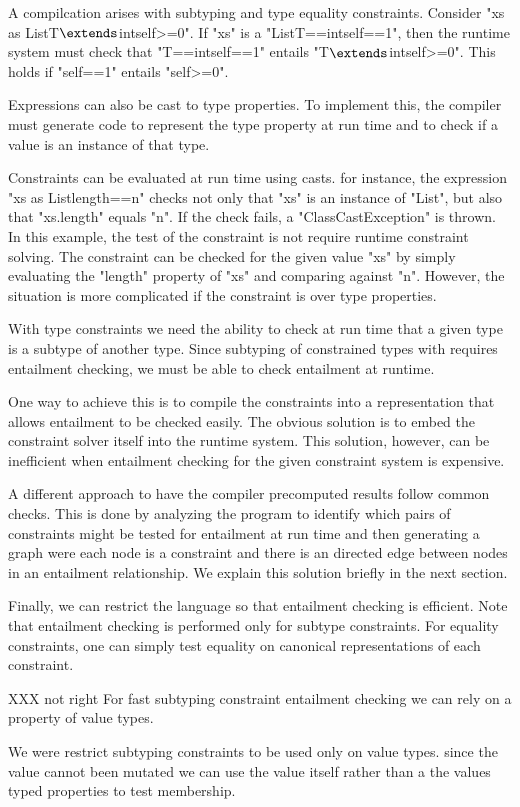 A compilcation arises with subtyping and type equality constraints.
        Consider
        \xcdmath"xs as List{T$\extends$int{self>=0}}".
        If \xcd"xs" is a \xcd"List{T==int{self==1}}",
        then the runtime system must check that
                         \xcd"T==int{self==1}" entails
                       \xcdmath"T$\extends$int{self>=0}".
                       This holds if \xcd"self==1" entails \xcd"self>=0".

Expressions can also be cast to type properties.  To implement this,
the compiler must generate code to represent the type property at
run time and to check if a value is an instance of that type.

Constraints can be evaluated at run time using casts.
 for instance, the expression 
        \xcd"xs as List{length==n}" checks not only 
        that \xcd"xs"
         is an instance of
        \xcd"List", but also that \xcd"xs.length" equals \xcd"n".
        If the check fails, a \xcd"ClassCastException"
        is thrown.  
In this example, the test of the constraint is not require runtime constraint
solving.  The constraint can be checked for the given value \xcd"xs"  by simply
evaluating the \xcd"length" property of \xcd"xs" and comparing against \xcd"n".
However, the situation is more complicated if the constraint  is over type
properties.

With type constraints we need the ability to check at run time that a given
type is a subtype of another type.  Since subtyping of constrained types with
requires entailment checking, we must be able to check entailment at runtime.

One way to achieve this is to compile the constraints into a representation
that allows entailment to be checked easily. The obvious solution is to embed
the constraint solver itself into the runtime system.
This solution,  however, can be inefficient when
entailment checking for the given constraint system is expensive.

A different approach to have the compiler precomputed results follow common
checks. This is done by analyzing the program to identify which pairs of
constraints might be tested for entailment at run time and then generating a
graph were each node is a constraint and there is an directed edge between
nodes in an entailment relationship.
We explain this solution briefly in the next section.

Finally, we can restrict the language so that entailment checking is
efficient. Note that entailment checking is performed only for subtype
constraints. For equality constraints, one can  simply test equality on
canonical representations of each constraint.

XXX not right
For fast subtyping constraint entailment checking we can rely on a property of value types.

We were  restrict subtyping constraints to be used only on value types.  since
the value cannot been mutated we can use the value itself rather than a the
values typed properties to test membership.

